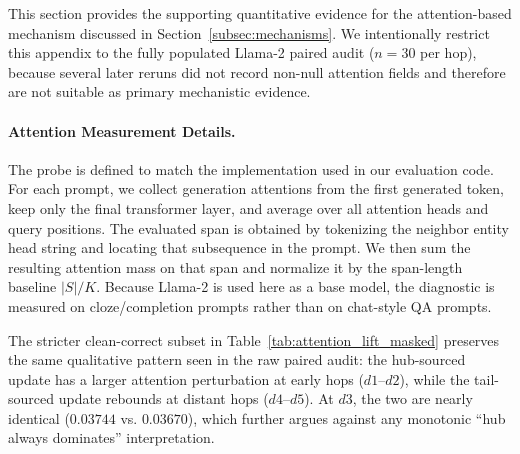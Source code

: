 This section provides the supporting quantitative evidence for the attention-based mechanism discussed in Section~\ref{subsec:mechanisms}. We intentionally restrict this appendix to the fully populated Llama-2 paired audit ($n=30$ per hop), because several later reruns did not record non-null attention fields and therefore are not suitable as primary mechanistic evidence.

\paragraph{Attention Measurement Details.}
The probe is defined to match the implementation used in our evaluation code. For each prompt, we collect generation attentions from the first generated token, keep only the final transformer layer, and average over all attention heads and query positions. The evaluated span is obtained by tokenizing the neighbor entity head string and locating that subsequence in the prompt. We then sum the resulting attention mass on that span and normalize it by the span-length baseline $|S|/K$. Because Llama-2 is used here as a base model, the diagnostic is measured on cloze/completion prompts rather than on chat-style QA prompts.



The stricter clean-correct subset in Table~\ref{tab:attention_lift_masked} preserves the same qualitative pattern seen in the raw paired audit: the hub-sourced update has a larger attention perturbation at early hops ($d1$--$d2$), while the tail-sourced update rebounds at distant hops ($d4$--$d5$). At $d3$, the two are nearly identical ($0.03744$ vs. $0.03670$), which further argues against any monotonic ``hub always dominates'' interpretation.





